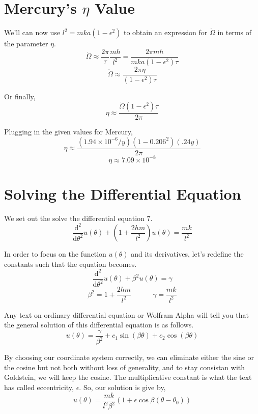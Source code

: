 \documentclass[10pt,a4paper]{article}
\begin{document}
\section{Mercury's $\eta$ Value}
We'll can now use $l^2=mka(1-\epsilon^2)$ to obtain an expression for $\dot{\Omega}$ in terms of the parameter $\eta$.
\begin{equation}
\dot{\Omega}\approx\frac{2\pi}{\tau}\frac{mh}{l^2}=\frac{2\pi mh}{mka(1-\epsilon^2)\tau}
\end{equation}
\begin{equation}
\dot{\Omega}\approx\frac{2\pi\eta}{(1-\epsilon^2)\tau}
\end{equation}

Or finally,
\begin{equation}
\eta\approx\frac{\dot{\Omega}(1-\epsilon^2)\tau}{2\pi}
\end{equation}

Plugging in the given values for Mercury,
\begin{equation}
\eta\approx\frac{(1.94\times10^{-6}/y)(1-0.206^2)(.24 y)}{2\pi}
\end{equation}
\begin{equation}
\eta\approx7.09\times 10^{-8}
\end{equation}

\appendix
\section{Solving the Differential Equation}
We set out the solve the differential equation 7.
\begin{equation}
\frac{\mathrm{d}^2}{\mathrm{d}\theta^2}u(\theta)+\left(1+\frac{2hm}{l^2}\right)u(\theta)=\frac{mk}{l^2}
\end{equation}

In order to focus on the function $u(\theta)$ and its derivatives, let's redefine the constants such that the equation becomes.
\begin{equation}
\frac{\mathrm{d}^2}{\mathrm{d}\theta^2}u(\theta)+\beta^2u(\theta)=\gamma
\end{equation}
\begin{equation}
\beta^2=1+\frac{2hm}{l^2}
\quad\quad\quad
\gamma=\frac{mk}{l^2}
\end{equation}

Any text on ordinary differential equation or Wolfram Alpha will tell you that the general solution of this differential equation is as follows.
\begin{equation}
u(\theta)=\frac{\gamma}{\beta^2}+c_1\sin(\beta\theta)+c_2\cos(\beta\theta)
\end{equation}

By choosing our coordinate system correctly, we can eliminate either the sine or the cosine but not both without loss of generality, and to stay consistan with Goldstein, we will keep the cosine.  The multiplicative constant is what the text has called eccentricity, $\epsilon$.  So, our solution is give by,
\begin{equation}
u(\theta)=\frac{mk}{l^2\beta^2}(1+\epsilon\cos\beta(\theta-\theta_0))
\end{equation}
\end{document}
